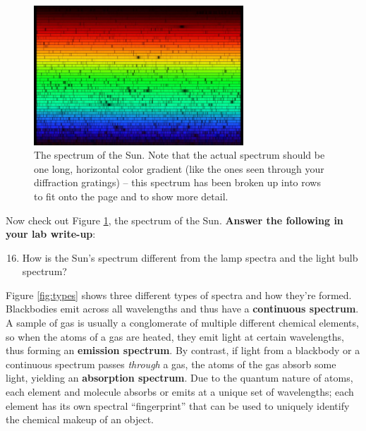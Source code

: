 \documentclass[11pt]{article}
\begin{document}
\begin{figure}[h!]
    \centering
    \includegraphics[width=0.7\textwidth]{Images/sun_spec.jpg}
    \caption{The spectrum of the Sun. Note that the actual spectrum should be one long, horizontal color gradient (like the ones seen through your diffraction gratings) -- this spectrum has been broken up into rows to fit onto the page and to show more detail.}
    \label{fig:sun}
\end{figure}

\noindent
Now check out Figure \ref{fig:sun}, the spectrum of the Sun. \textbf{Answer the following in your lab write-up}:
\begin{enumerate}
    \setcounter{enumi}{15}
    \item How is the Sun's spectrum different from the lamp spectra and the light bulb spectrum?
\end{enumerate}

\bigskip

Figure \ref{fig:types} shows three different types of spectra and how they're formed. Blackbodies emit across all wavelengths and thus have a \textbf{continuous spectrum}. A sample of gas is usually a conglomerate of multiple different chemical elements, so when the atoms of a gas are heated, they emit light at certain wavelengths, thus forming an \textbf{emission spectrum}. By contrast, if light from a blackbody or a continuous spectrum passes \emph{through} a gas, the atoms of the gas absorb some light, yielding an \textbf{absorption spectrum}. Due to the quantum nature of atoms, each element and molecule absorbs or emits at a unique set of wavelengths; each element has its own spectral ``fingerprint'' that can be used to uniquely identify the chemical makeup of an object.
\end{document}
